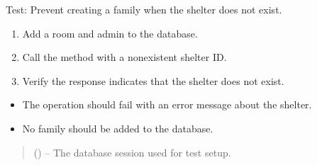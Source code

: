 \documentclass[letterpaper,10pt,english]{sphinxmanual}
\begin{document}
\begin{fulllineitems}
\label{\detokenize{test:test.test_family.test_create_family_shelter_not_exist}}
\pysigstartsignatures
\pysiglinewithargsret
{}
{}
{}
\pysigstopsignatures
\sphinxAtStartPar
Test: Prevent creating a family when the shelter does not exist.
\begin{description}
\begin{enumerate}
%
\item {} 
\sphinxAtStartPar
Add a room and admin to the database.

\item {} 
\sphinxAtStartPar
Call the  method with a nonexistent shelter ID.

\item {} 
\sphinxAtStartPar
Verify the response indicates that the shelter does not exist.

\end{enumerate}

\begin{itemize}
\item {} 
\sphinxAtStartPar
The operation should fail with an error message about the shelter.

\item {} 
\sphinxAtStartPar
No family should be added to the database.

\end{itemize}

\end{description}
\begin{quote}\begin{description}
\sphinxAtStartPar
{} () – The database session used for test setup.

\end{description}\end{quote}

\end{fulllineitems}

\end{document}

